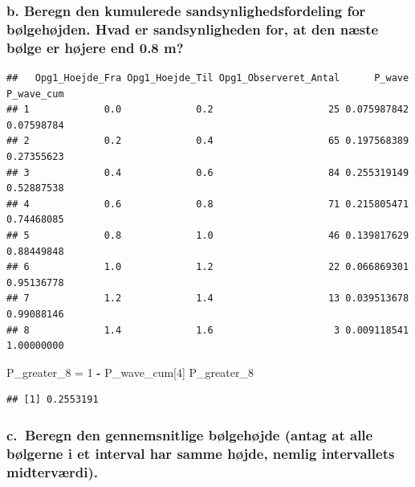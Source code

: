 \documentclass[
]{article}
\newenvironment{Shaded}{\begin{snugshade}}{\end{snugshade}}
\newcommand{\DecValTok}[1]{\textcolor[rgb]{0.00,0.00,0.81}{#1}}
\newcommand{\FunctionTok}[1]{\textcolor[rgb]{0.13,0.29,0.53}{\textbf{#1}}}
\newcommand{\NormalTok}[1]{#1}
\newcommand{\OtherTok}[1]{\textcolor[rgb]{0.56,0.35,0.01}{#1}}
\newcommand{\SpecialCharTok}[1]{\textcolor[rgb]{0.81,0.36,0.00}{\textbf{#1}}}
\begin{document}
\subsubsection{b. Beregn den kumulerede sandsynlighedsfordeling for
bølgehøjden. Hvad er sandsynligheden for, at den næste bølge er højere
end 0.8
m?}\label{b.-beregn-den-kumulerede-sandsynlighedsfordeling-for-buxf8lgehuxf8jden.-hvad-er-sandsynligheden-for-at-den-nuxe6ste-buxf8lge-er-huxf8jere-end-0.8-m}

\begin{Shaded}
\end{Shaded}

\begin{verbatim}
##   Opg1_Hoejde_Fra Opg1_Hoejde_Til Opg1_Observeret_Antal      P_wave P_wave_cum
## 1             0.0             0.2                    25 0.075987842 0.07598784
## 2             0.2             0.4                    65 0.197568389 0.27355623
## 3             0.4             0.6                    84 0.255319149 0.52887538
## 4             0.6             0.8                    71 0.215805471 0.74468085
## 5             0.8             1.0                    46 0.139817629 0.88449848
## 6             1.0             1.2                    22 0.066869301 0.95136778
## 7             1.2             1.4                    13 0.039513678 0.99088146
## 8             1.4             1.6                     3 0.009118541 1.00000000
\end{verbatim}

\begin{Shaded}
\begin{Highlighting}[]
\NormalTok{P\_greater\_8 }\OtherTok{=} \DecValTok{1} \SpecialCharTok{{-}}\NormalTok{ P\_wave\_cum[}\DecValTok{4}\NormalTok{]}
\NormalTok{P\_greater\_8}
\end{Highlighting}
\end{Shaded}

\begin{verbatim}
## [1] 0.2553191
\end{verbatim}

\subsubsection{c.~Beregn den gennemsnitlige bølgehøjde (antag at alle
bølgerne i et interval har samme højde, nemlig intervallets
midterværdi).}\label{c.-beregn-den-gennemsnitlige-buxf8lgehuxf8jde-antag-at-alle-buxf8lgerne-i-et-interval-har-samme-huxf8jde-nemlig-intervallets-midtervuxe6rdi.}
\end{document}
